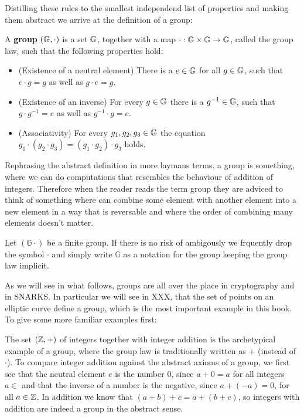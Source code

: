 Distilling these rules to the smallest independend list of properties and making them abstract we arrive at the definition of a group:

A \textbf{group} $(\mathbb{G},\cdot) $ is a set $ \mathbb{G}$, together with a map $ \cdot: \mathbb{G} \times \mathbb{G} \to \mathbb{G} $, called the group law, such that the following properties hold:
\begin{itemize}
\item (Existence of a neutral element) There is a $e\in\mathbb{G}$ for all $g\in\mathbb{G}$, such that $e\cdot g=g$ as well as $g\cdot e = g$.
\item (Existence of an inverse) For every $g\in\mathbb{G}$ there is a $g^{-1}\in\mathbb{G}$, such that $g\cdot g^{-1}=e$ as well as $g^{-1}\cdot g = e$.
\item (Associativity) For every $g_1,g_2,g_3\in\mathbb{G}$ the equation 
$g_1\cdot(g_2\cdot g_3) = (g_1\cdot g_2)\cdot g_3$ holds.
\end{itemize}
Rephrasing the abstract definition in more laymans terms, a group is something, where we can do computations that resembles the behaviour of addition of integers. Therefore when the reader reads the term group they are adviced to think of something where can combine some element with another element into a new element in a way that is reversable and where the order of combining many elements doesn't matter.
\begin{notation}
Let $(\mathbb{G}\cdot)$ be a finite group. If there is no risk of ambigously we frquently drop the symbol $\cdot$ and simply write $\mathbb{G}$ as a notation for the group keeping the group law implicit.
\end{notation}
As we will see in what follows, groups are all over the place in cryptography and in SNARKS. In particular we will see in XXX, that the set of points on an elliptic curve define a group, which is the most important example in this book. To give some more familiar examples first:
\begin{example}
The set $(\mathbb{Z},+)$ of integers together with integer addition is the archetypical example of a group, where the group law is traditionally written as $+$ (instead of $\cdot$). To compare integer addition against the abstract axioms of a group, we first see that the neutral element $e$ is the number $0$, since $a+0=a$ for all integers $a\in $ and that the inverse of a number is the negative, since $a+(-a)=0$, for all $a\in\mathbb{Z}$. In addition we know that $(a+b)+c=a+(b+c)$, so integers with addition are indeed a group in the abstract sense.
\end{example}
